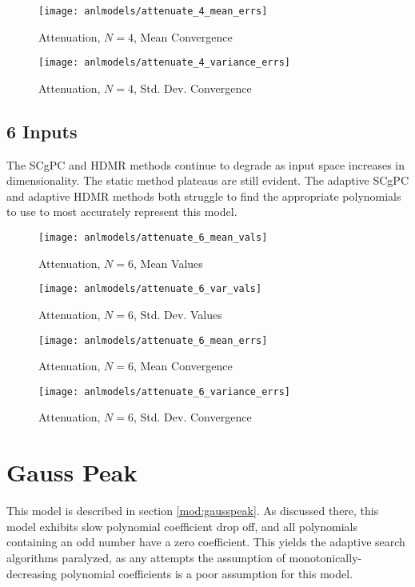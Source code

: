 \begin{figure}[H]
  \centering
  \texttt{[image: anlmodels/attenuate\_4\_mean\_errs]}
  \caption{Attenuation, $N=4$, Mean Convergence}
  \label{fig:hdmr attenuate mean errors 4}
\end{figure}
\begin{figure}[H]
  \centering
  \texttt{[image: anlmodels/attenuate\_4\_variance\_errs]}
  \caption{Attenuation, $N=4$, Std. Dev. Convergence}
  \label{fig:hdmr attenuate var errors 4}
\end{figure}

\subsection{6 Inputs}
The SCgPC and HDMR methods continue to degrade as input space increases in dimensionality.  The static method
plateaus are still evident.  The adaptive SCgPC and adaptive HDMR methods both struggle to find the
appropriate polynomials to use to most accurately represent this model.
\begin{figure}[H]
  \centering
  \texttt{[image: anlmodels/attenuate\_6\_mean\_vals]}
  \caption{Attenuation, $N=6$, Mean Values}
  \label{fig:hdmr attenuate mean values 6}
\end{figure}
\begin{figure}[H]
  \centering
  \texttt{[image: anlmodels/attenuate\_6\_var\_vals]}
  \caption{Attenuation, $N=6$, Std. Dev. Values}
  \label{fig:hdmr attenuate var values 6}
\end{figure}

\begin{figure}[H]
  \centering
  \texttt{[image: anlmodels/attenuate\_6\_mean\_errs]}
  \caption{Attenuation, $N=6$, Mean Convergence}
  \label{fig:hdmr attenuate mean errors 6}
\end{figure}
\begin{figure}[H]
  \centering
  \texttt{[image: anlmodels/attenuate\_6\_variance\_errs]}
  \caption{Attenuation, $N=6$, Std. Dev. Convergence}
  \label{fig:hdmr attenuate var errors 6}
\end{figure}


\section{Gauss Peak}
This model is described in section \ref{mod:gausspeak}.
As discussed there, this model exhibits slow polynomial coefficient drop off, and all polynomials containing
an odd number have a zero coefficient.  This yields the adaptive search algorithms paralyzed, as any attempts
the assumption of monotonically-decreasing polynomial coefficients is a poor assumption for this model.
